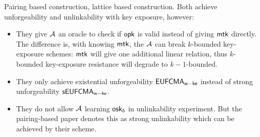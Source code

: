 \iffalse
\begin{itemize}
    \item \textbf{Group based with dlog keys} - 
        \begin{itemize}
            \item Bounded leakage of osk - \textbf{achievable}
            \item Unbounded leakage would imply oblivious sampler/IBE (PRV12)
            \item Fuzziness - \textbf{achievable}
            \item Unbounded leakage of osk  - implies a strong form of IBE  - \textbf{intuition}
        \end{itemize}
    \item \textbf{Lattice based} - 
        \begin{itemize}
            \item Practical bounded leakage of osk - \textbf{achievable (to be verified)}  with slightly worse signing time for Dilithium
            \item Slightly inefficient unbounded leakage of osk = \textbf{achievable} with GPV trapdoors + Lyu signatures
            \item Practical unbounded leakage of osk - \textbf{achievable (conditioned on first one)} with slightly worse signing time for Dilithium extended
            \item Practical unbounded leakage of osk for Dilithium - implies oblivious LWE sampling and iO - \textbf{intuition}
            \item post-quantum fuzziness with highly efficient opk 
        \end{itemize}
\end{itemize}
\fi


\iffalse
Pairing based construction\cite{EUROSP:LYWNW19}, lattice based construction\cite{ESORICS:LLNYY20}. Both achieve unforgeability and unlinkability with key exposure, however:
\begin{itemize}
    \item They give $\mathcal{A}$ an oracle to check if $\mathsf{opk}$ is valid instead of giving $\mathsf{mtk}$ directly. The difference is, with knowing $\mathsf{mtk}$, the $\mathcal{A}$ can break $k$-bounded key-exposure schemes: $\mathsf{mtk}$ will give one additional linear relation, thus $k$-bounded key-exposure resistance will degrade to $k-1$-bounded.
    \item They only achieve existential unforgeability $\mathsf{EUFCMA}_\mathsf{w-ke}$ instead of strong unforgeability $\mathsf{sEUFCMA}_\mathsf{w-ke}$.
    \item They do not allow $\mathcal{A}$ learning $\mathsf{osk}_b$ in unlinkability experiment. But the pairing-based paper denotes this as strong unlinkability which can be achieved by their scheme.
\end{itemize}

